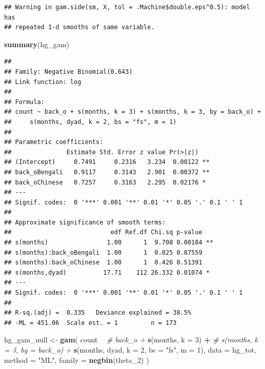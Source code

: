 \documentclass[]{article}
\newenvironment{Shaded}{\begin{snugshade}}{\end{snugshade}}
\newcommand{\CommentTok}[1]{\textcolor[rgb]{0.56,0.35,0.01}{\textit{#1}}}
\newcommand{\DataTypeTok}[1]{\textcolor[rgb]{0.13,0.29,0.53}{#1}}
\newcommand{\DecValTok}[1]{\textcolor[rgb]{0.00,0.00,0.81}{#1}}
\newcommand{\KeywordTok}[1]{\textcolor[rgb]{0.13,0.29,0.53}{\textbf{#1}}}
\newcommand{\NormalTok}[1]{#1}
\newcommand{\OperatorTok}[1]{\textcolor[rgb]{0.81,0.36,0.00}{\textbf{#1}}}
\newcommand{\StringTok}[1]{\textcolor[rgb]{0.31,0.60,0.02}{#1}}
\begin{document}
\begin{verbatim}
## Warning in gam.side(sm, X, tol = .Machine$double.eps^0.5): model has
## repeated 1-d smooths of same variable.
\end{verbatim}

\begin{Shaded}
\begin{Highlighting}[]
\KeywordTok{summary}\NormalTok{(hg_gam)}
\end{Highlighting}
\end{Shaded}

\begin{verbatim}
## 
## Family: Negative Binomial(0.643) 
## Link function: log 
## 
## Formula:
## count ~ back_o + s(months, k = 3) + s(months, k = 3, by = back_o) + 
##     s(months, dyad, k = 2, bs = "fs", m = 1)
## 
## Parametric coefficients:
##               Estimate Std. Error z value Pr(>|z|)   
## (Intercept)     0.7491     0.2316   3.234  0.00122 **
## back_oBengali   0.9117     0.3143   2.901  0.00372 **
## back_oChinese   0.7257     0.3163   2.295  0.02176 * 
## ---
## Signif. codes:  0 '***' 0.001 '**' 0.01 '*' 0.05 '.' 0.1 ' ' 1
## 
## Approximate significance of smooth terms:
##                           edf Ref.df Chi.sq p-value   
## s(months)                1.00      1  9.708 0.00184 **
## s(months):back_oBengali  1.00      1  0.025 0.87559   
## s(months):back_oChinese  1.00      1  0.426 0.51391   
## s(months,dyad)          17.71    112 26.332 0.01074 * 
## ---
## Signif. codes:  0 '***' 0.001 '**' 0.01 '*' 0.05 '.' 0.1 ' ' 1
## 
## R-sq.(adj) =  0.335   Deviance explained = 38.5%
## -ML = 451.06  Scale est. = 1         n = 173
\end{verbatim}

\begin{Shaded}
\begin{Highlighting}[]
\NormalTok{hg_gam_null <-}\StringTok{ }\KeywordTok{gam}\NormalTok{(}
\NormalTok{  count }\OperatorTok{~}
\StringTok{    }\CommentTok{# back_o +}
\StringTok{    }\KeywordTok{s}\NormalTok{(months, }\DataTypeTok{k =} \DecValTok{3}\NormalTok{) }\OperatorTok{+}
\StringTok{    }\CommentTok{# s(months, k = 3, by = back_o) +}
\StringTok{    }\KeywordTok{s}\NormalTok{(months, dyad, }\DataTypeTok{k =} \DecValTok{2}\NormalTok{, }\DataTypeTok{bs =} \StringTok{"fs"}\NormalTok{, }\DataTypeTok{m =} \DecValTok{1}\NormalTok{),}
  \DataTypeTok{data =}\NormalTok{ hg_tot,}
  \DataTypeTok{method =} \StringTok{"ML"}\NormalTok{,}
  \DataTypeTok{family =} \KeywordTok{negbin}\NormalTok{(theta_}\DecValTok{2}\NormalTok{)}
\NormalTok{)}
\end{Highlighting}
\end{Shaded}
\end{document}
